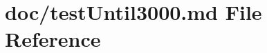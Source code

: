 \hypertarget{test_until3000_8md}{}\section{doc/test\+Until3000.md File Reference}
\label{test_until3000_8md}
